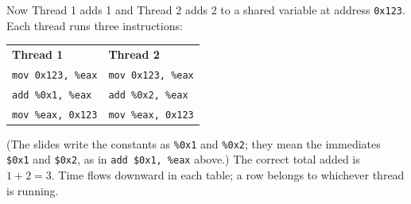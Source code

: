 \documentclass[11pt,a4paper]{article}
\begin{document}
Now Thread 1 adds 1 and Thread 2 adds 2 to a shared variable at address
\texttt{0x123}. Each thread runs three instructions:
\begin{center}
\begin{tabular}{@{}ll@{}}
  \textbf{Thread 1} & \textbf{Thread 2} \\
  \texttt{mov 0x123, \%eax} & \texttt{mov 0x123, \%eax} \\
  \texttt{add \%0x1, \%eax} & \texttt{add \%0x2, \%eax} \\
  \texttt{mov \%eax, 0x123} & \texttt{mov \%eax, 0x123} \\
\end{tabular}
\end{center}
(The slides write the constants as \texttt{\%0x1} and \texttt{\%0x2}; they
mean the immediates \texttt{\$0x1} and \texttt{\$0x2}, as in
\texttt{add \$0x1, \%eax} above.) The correct total added is \(1+2=3\). Time flows downward in each table;
a row belongs to whichever thread is running.
\end{document}
